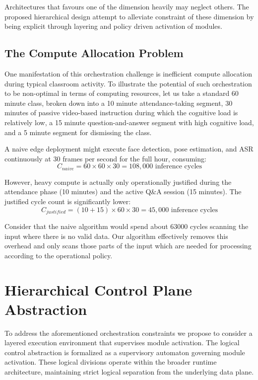 \documentclass[conference]{IEEEtran}
\begin{document}
Architectures that favours one of the dimension heavily may neglect others. The proposed hierarchical design attempt to alleviate constraint of these dimension by being explicit through layering and policy driven activation of modules.

\subsection{The Compute Allocation Problem}
One manifestation of this orchestration challenge is inefficient compute allocation during typical classroom activity. To illustrate the potential of such orchestration to be non-optimal in terms of computing resources, let us take a standard 60 minute class, broken down into a 10 minute attendance-taking segment, 30 minutes of passive video-based instruction during which the cognitive load is relatively low, a 15 minute question-and-answer segment with high cognitive load, and a 5 minute segment for dismissing the class.

A naive edge deployment might execute face detection, pose estimation, and ASR continuously at 30 frames per second for the full hour, consuming:
\begin{equation}
C_{naive} = 60 \times 60 \times 30 = 108,000 \text{ inference cycles}
\end{equation}

However, heavy compute is actually only operationally justified during the attendance phase (10 minutes) and the active Q\&A session (15 minutes). The justified cycle count is significantly lower:
\begin{equation}
C_{justified} = (10 + 15) \times 60 \times 30 = 45,000 \text{ inference cycles}
\end{equation}

Consider that the naive algorithm would spend about 63000 cycles scanning the input where there is no valid data. Our algorithm effectively removes this overhead and only scans those parts of the input which are needed for processing according to the operational policy.

\section{Hierarchical Control Plane Abstraction}

To address the aforementioned orchestration constraints we propose to consider a layered execution environment that supervises module activation. The logical control abstraction is formalized as a supervisory automaton governing module activation. These logical divisions operate within the broader runtime architecture, maintaining strict logical separation from the underlying data plane.
\end{document}

